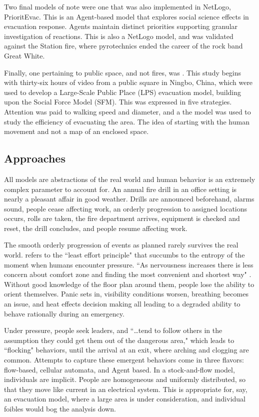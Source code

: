 \documentclass[12pt,letterpaper]{article}
\begin{document}
Two final models of note were one that was also implemented in NetLogo, \cite{prioritEvac} PrioritEvac. This is an Agent-based model that explores social science effects in evacuation response. Agents maintain distinct priorities supporting granular investigation of reactions. This is also a NetLogo model, and was validated against the Station fire, where pyrotechnics ended the career of the rock band Great White.

Finally, one pertaining to public space, and not fires, was \cite{zhouSimulationPedestrianEvacuation2019}. This study begins with thirty-six hours of video from a public square in Ningbo, China, which were used to develop a Large-Scale Public Place (LPS) evacuation model, building upon the Social Force Model (SFM). This was expressed in five strategies. Attention was paid to walking speed and diameter, and a the model was used to study the efficiency of evacuating the area. The idea of starting with the human movement and not a map of an enclosed space.

\subsection {Approaches}
All models are abstractions of the real world and human behavior is an extremely complex parameter to account for. An annual fire drill in an office setting is nearly a pleasant affair in good weather. Drills are announced beforehand, alarms sound, people cease affecting work, an orderly progression to assigned locations occurs, rolls are taken, the fire department arrives, equipment is checked and reset, the drill concludes, and people resume affecting work.


The smooth orderly progression of events as planned rarely survives the real world.  \cite{almeidaCrowdSimulationModeling2013} refers to the ``least effort principle" that succumbs to the entropy of the moment when humans encounter pressure.  ``As nervousness increases there is less concern about comfort zone and finding the most convenient and shortest way" \cite{almeidaCrowdSimulationModeling2013}. Without good knowledge of the floor plan around them, people lose the ability to orient themselves. Panic sets in, visibility conditions worsen, breathing becomes an issue, and heat effects decision making all leading to a degraded ability to behave rationally during an emergency.

Under pressure, people seek leaders, and ``\dots tend to follow others in the assumption they could get them out of the dangerous area," which leads to ``flocking" behaviors, until the arrival at an exit, where arching and clogging are common.  Attempts to capture these emergent behaviors come in three flavors: flow-based, cellular automata, and Agent based. In a stock-and-flow model, individuals are implicit. People are homogeneous and uniformly distributed, so that they move like current in an electrical system. This is appropriate for, say, an evacuation model, where a large area is under consideration, and individual foibles would bog the analysis down.
\end{document}
